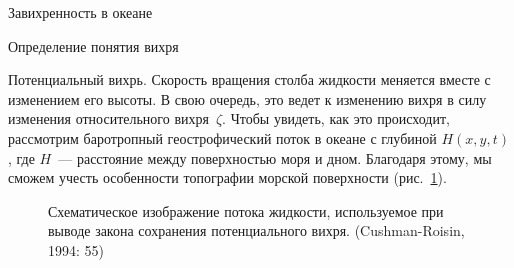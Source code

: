 \begin{chapter}{Завихренность в океане}
\begin{section}{Определение понятия вихря}
\begin{paragraph}{Потенциальный вихрь.}
Скорость вращения столба жидкости меняется вместе с изменением его высоты.
В свою очередь, это ведет к изменению вихря в силу изменения относительного
вихря~$\zeta$. Чтобы увидеть, как это происходит, рассмотрим баротропный 
геострофический поток в океане с глубиной $H(x, y, t)$, где $H$~--- расстояние 
между поверхностью моря и дном. Благодаря этому, мы сможем учесть особенности 
топографии морской поверхности (рис.~\ref{fig:vorticitysketch}).
%

\begin{figure}[t!]
\begin{center}
\end{center}
\caption{Схематическое изображение потока жидкости, используемое при выводе 
закона сохранения потенциального вихря. (Cushman-Roisin, 1994: 55)}
\label{fig:vorticitysketch}
\vspace{-3ex}
\end{figure}
%
%


\end{paragraph}
\end{section}
\end{chapter}
